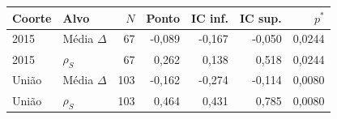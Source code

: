 \begin{tabular}{llrrrrr}
\toprule
Coorte & Alvo & $N$ & Ponto & IC inf. & IC sup. & $p^*$\\
\midrule
2015 & Média $\Delta$ & 67 & -0,089 & -0,167 & -0,050 & 0,0244\\
2015 & $\rho_S$ & 67 & 0,262 & 0,138 & 0,518 & 0,0244\\
União & Média $\Delta$ & 103 & -0,162 & -0,274 & -0,114 & 0,0080\\
União & $\rho_S$ & 103 & 0,464 & 0,431 & 0,785 & 0,0080\\
\bottomrule
\end{tabular}
